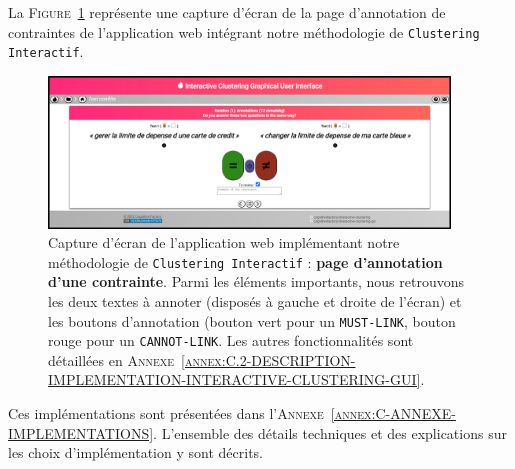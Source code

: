 		
		\begin{leftBarExamples}
			La \textsc{Figure~\ref{figure:3.2.3-DESCRIPTION-TECHNIQUE-IMPLEMENTATION-EXEMPLE}} représente une capture d'écran de la page d'annotation de contraintes de l'application web intégrant notre méthodologie de \texttt{Clustering Interactif}.
			
			\begin{figure}[H]
				\centering
				\includegraphics[width=0.95\textwidth]{figures/interactive-clustering-application-annotation-0small}
				\caption{
					Capture d'écran de l'application web implémentant notre méthodologie de \texttt{Clustering Interactif} : \textbf{page d'annotation d'une contrainte}.
					Parmi les éléments importants, nous retrouvons les deux textes à annoter (disposés à gauche et droite de l'écran) et les boutons d'annotation (bouton vert pour un \texttt{MUST-LINK}, bouton rouge pour un \texttt{CANNOT-LINK}.
					Les autres fonctionnalités sont détaillées en \textsc{Annexe~\ref{annex:C.2-DESCRIPTION-IMPLEMENTATION-INTERACTIVE-CLUSTERING-GUI}}.
				}
				\label{figure:3.2.3-DESCRIPTION-TECHNIQUE-IMPLEMENTATION-EXEMPLE}
			\end{figure}
		\end{leftBarExamples}
		
		\begin{leftBarInformation}
			Ces implémentations sont présentées dans l'\textsc{Annexe~\ref{annex:C-ANNEXE-IMPLEMENTATIONS}}.
			L'ensemble des détails techniques et des explications sur les choix d'implémentation y sont décrits.
		\end{leftBarInformation}
